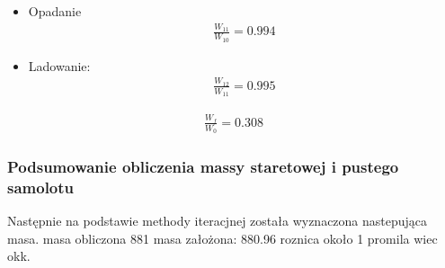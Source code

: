 \begin{itemize}
                \begin{align}
                    \frac{W_{10}}{W_{9}}=0.999
                \end{align}  
            \item Opadanie
                \begin{align}
                    \frac{W_{11}}{W_{10}}=0.994
                \end{align}
            \item Ladowanie:
                \begin{align}
                    \frac{W_{12}}{W_{11}}= 0.995
                \end{align}
        \end{itemize}

        \begin{align}
            \frac{W_{f}}{W_{0}} = 0.308
        \end{align}

        \subsubsection{Podsumowanie obliczenia massy staretowej i pustego samolotu}

            Następnie na podstawie methody iteracjnej została wyznaczona nastepująca masa.
            masa obliczona 881 masa założona: 880.96 roznica około 1 promila wiec okk.

        

    










 
